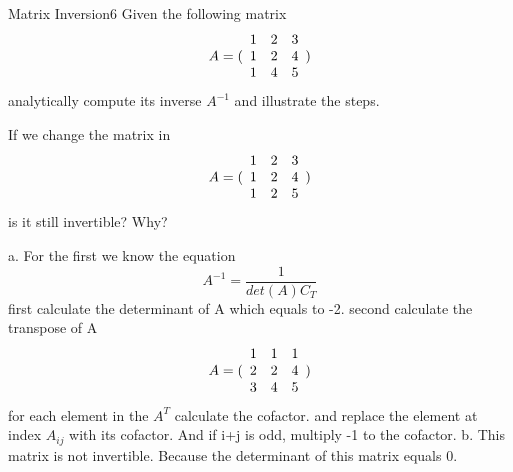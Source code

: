 
\begin{question}{Matrix Inversion}{6}
Given the following matrix 
\begin{equation*}
     A = ( \begin{array}{c c c} 
     1 & 2 & 3 \\
     1 & 2 & 4 \\
     1 & 4 & 5 \end{array} )
\end{equation*}
analytically compute its inverse $ A^{-1}$ and illustrate the steps.


If we change the matrix in
\begin{equation*}
     A = ( \begin{array}{c c c} 
     1 & 2 & 3 \\
     1 & 2 & 4 \\
     1 & 2 & 5 \end{array} )
\end{equation*}
is it still invertible? Why?

\begin{answer}
a. For the first we know the equation 
$$A^{-1} = \frac{1}{det(A)C_T}$$
first calculate the determinant of A which equals to -2. 
second calculate the transpose of A
\begin{equation*}
     A = ( \begin{array}{c c c} 
     1 & 1 & 1 \\
     2 & 2 & 4 \\
     3 & 4 & 5 \end{array} )
\end{equation*}
for each element in the $A^T$ calculate the cofactor. and replace the element at index $A_{ij}$ with its cofactor. And if i+j is odd, multiply -1 to the cofactor.
b. This matrix is not invertible. Because the determinant of this matrix equals 0.

\end{answer}

\end{question}
	


